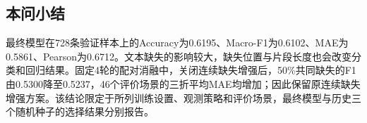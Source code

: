 \hypertarget{q2-ux672cux95eeux5c0fux7ed3}{%
\subsection{本问小结}\label{q2-ux672cux95eeux5c0fux7ed3}}

最终模型在728条验证样本上的Accuracy为0.6195、Macro-F1为0.6102、MAE为0.5861、Pearson为0.6712。文本缺失的影响较大，缺失位置与片段长度也会改变分类和回归结果。固定4轮的配对消融中，关闭连续缺失增强后，50\%共同缺失的F1由0.5300降至0.5237，46个评价场景的三折平均MAE均增加；因此保留原连续缺失增强方案。该结论限定于所列训练设置、观测策略和评价场景，最终模型与历史三个随机种子的选择结果分别报告。
